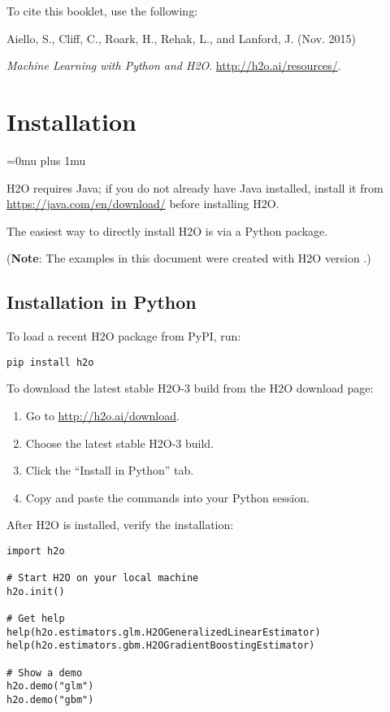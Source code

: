 To cite this booklet, use the following: 

Aiello, S., Cliff, C., Roark, H., Rehak, L., and Lanford, J. (Nov. 2015) {\textit{Machine Learning with Python and H2O}. {\url{http://h2o.ai/resources/}}. 


\section{Installation} 
\Urlmuskip=0mu plus 1mu\relax %

H2O requires Java; if you do not already have Java installed, install it from {\url{https://java.com/en/download/}} before installing H2O. 

The easiest way to directly install H2O is  via a Python package.

({\bf{Note}}: The examples in this document were created with H2O version \waterVersion.)

\subsection{Installation in Python}

To load a recent H2O package from PyPI, run:

\begin{lstlisting}[style=python]
pip install h2o
\end{lstlisting}

To download the
latest stable H2O-3 build from the H2O download page:

\begin{enumerate}
\item Go to {\url{http://h2o.ai/download}}.
\item Choose the latest stable H2O-3 build.
\item Click the ``Install in Python'' tab.
\item Copy and paste the commands into your Python session.
\end{enumerate}

After H2O is installed, verify the installation:

\begin{lstlisting}[style=python]
import h2o

# Start H2O on your local machine
h2o.init()

# Get help
help(h2o.estimators.glm.H2OGeneralizedLinearEstimator)
help(h2o.estimators.gbm.H2OGradientBoostingEstimator)

# Show a demo
h2o.demo("glm")
h2o.demo("gbm")
\end{lstlisting}


}
